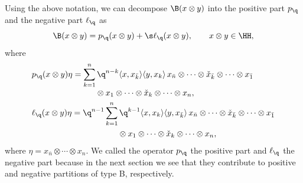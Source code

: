 \begin{Remark}\label{thm1}
	Using the above notation, we can decompose $\B(x\otimes y)$ into the positive part $p_\q$ and the negative part $\ell_{\q}$ as\vspace{-1mm}
\[
	\B(x\otimes y)= p_\q(x\otimes y)+ \s \ell_{\q}(x\otimes y), \qquad x\otimes y \in \HH,
\]
where\vspace{-2mm}
\begin{align}\label{rq}
&p_\q(x\otimes y)\eta = \sum_{k=1}^n \q^{n-k}\langle x, x_{\bar{k}}\rangle \langle y, x_k \rangle\, x_{\bar n }\otimes \cdots \otimes \check{x}_{\bar k} \otimes \cdots \otimes x_{\bar 1} \nonumber
\\[-1mm]
&\hphantom{p_\q(x\otimes y)\eta = \sum_{k=1}^n}
{}\otimes x_1\otimes \cdots \otimes \check{x}_k \otimes \cdots \otimes x_n,
\\
&\ell_{\q}(x\otimes y)\eta =\q^{n-1}\sum_{k=1}^n \q^{k-1}\langle x, x_{{k}}\rangle \langle y, x_{\bar{k}}\rangle\, x_{\bar n }\otimes \cdots \otimes \check{x}_{\bar k} \otimes \cdots \otimes x_{\bar 1} \nonumber
\\
&\hphantom{\ell_{\q}(x\otimes y)\eta =\q^{n-1}\sum_{k=1}^n}
\otimes x_1\otimes \cdots \otimes \check{x}_k \otimes \cdots \otimes x_n,\label{lq}
	\end{align}
	where $\eta=x_{\bar n }\otimes \cdots \otimes x_n$.
	We called the operator $p_\q$ the positive part and $\ell_{\q}$ the negative part because in the next section we see that they contribute to positive and negative partitions of type B, respectively.
\end{Remark}
